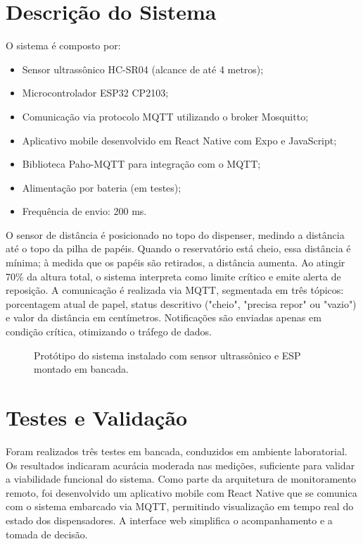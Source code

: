 \documentclass[english,hidelinks]{sbrt}
\begin{document}
\section{Descrição do Sistema}
O sistema é composto por:
\begin{itemize}
    \item Sensor ultrassônico HC-SR04 (alcance de até 4 metros);
    \item Microcontrolador ESP32 CP2103;
    \item Comunicação via protocolo MQTT utilizando o broker Mosquitto;
    \item Aplicativo mobile desenvolvido em React Native com Expo e JavaScript;
    \item Biblioteca Paho-MQTT para integração com o MQTT;
    \item Alimentação por bateria (em testes);
    \item Frequência de envio: 200 ms.
\end{itemize}
O sensor de distância é posicionado no topo do dispenser, medindo a distância até o topo da pilha de papéis. Quando o reservatório está cheio, essa distância é mínima; à medida que os papéis são retirados, a distância aumenta. Ao atingir 70\% da altura total, o sistema interpreta como limite crítico e emite alerta de reposição. A comunicação é realizada via MQTT, segmentada em três tópicos: porcentagem atual de papel, status descritivo ("cheio", "precisa repor" ou "vazio") e valor da distância em centímetros. Notificações são enviadas apenas em condição crítica, otimizando o tráfego de dados.

\begin{figure}[H]
  \centering
  \caption{Protótipo do sistema instalado com sensor ultrassônico e ESP montado em bancada.}
  \label{fig:sistema}
\end{figure}

\section{Testes e Validação}
Foram realizados três testes em bancada, conduzidos em ambiente laboratorial. Os resultados indicaram acurácia moderada nas medições, suficiente para validar a viabilidade funcional do sistema. Como parte da arquitetura de monitoramento remoto, foi desenvolvido um aplicativo mobile com React Native que se comunica com o sistema embarcado via MQTT, permitindo visualização em tempo real do estado dos dispensadores. A interface web simplifica o acompanhamento e a tomada de decisão.
\end{document}
